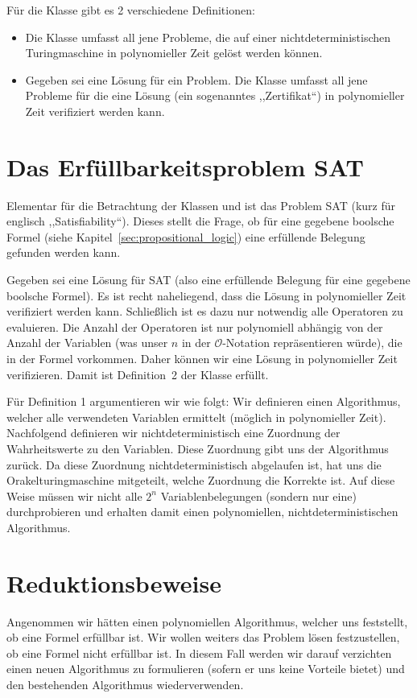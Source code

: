 Für die Klasse \cNP{} gibt es 2 verschiedene Definitionen:
\begin{itemize}
  \item Die Klasse \cNP{} umfasst all jene Probleme, die auf einer nichtdeterministischen Turingmaschine in polynomieller Zeit gelöst werden können.
  \item Gegeben sei eine Lösung für ein Problem. Die Klasse \cNP{} umfasst all jene Probleme für die eine Lösung (ein sogenanntes ,,Zertifikat``) in polynomieller Zeit verifiziert werden kann.
\end{itemize}

\section{Das Erfüllbarkeitsproblem SAT}
%
Elementar für die Betrachtung der Klassen \cP{} und \cNP{} ist das Problem SAT (kurz für englisch ,,Satisfiability``). Dieses stellt die Frage, ob für eine gegebene boolsche Formel (siehe Kapitel~\ref{sec:propositional_logic}) eine erfüllende Belegung gefunden werden kann.

Gegeben sei eine Lösung für SAT (also eine erfüllende Belegung für eine gegebene boolsche Formel). Es ist recht naheliegend, dass die Lösung in polynomieller Zeit verifiziert werden kann. Schließlich ist es dazu nur notwendig alle Operatoren zu evaluieren. Die Anzahl der Operatoren ist nur polynomiell abhängig von der Anzahl der Variablen (was unser $n$ in der $\mathcal{O}$-Notation repräsentieren würde), die in der Formel vorkommen. Daher können wir eine Lösung in polynomieller Zeit verifizieren. Damit ist Definition~2 der Klasse \cNP{} erfüllt.

Für Definition 1 argumentieren wir wie folgt: Wir definieren einen Algorithmus, welcher alle verwendeten Variablen ermittelt (möglich in polynomieller Zeit). Nachfolgend definieren wir nichtdeterministisch eine Zuordnung der Wahrheitswerte zu den Variablen. Diese Zuordnung gibt uns der Algorithmus zurück. Da diese Zuordnung nichtdeterministisch abgelaufen ist, hat uns die Orakelturingmaschine mitgeteilt, welche Zuordnung die Korrekte ist. Auf diese Weise müssen wir nicht alle $2^n$ Variablenbelegungen (sondern nur eine) durchprobieren und erhalten damit einen polynomiellen, nichtdeterministischen Algorithmus.

\section{Reduktionsbeweise}
%
Angenommen wir hätten einen polynomiellen Algorithmus, welcher uns feststellt, ob eine Formel erfüllbar ist. Wir wollen weiters das Problem lösen festzustellen, ob eine Formel nicht erfüllbar ist. In diesem Fall werden wir darauf verzichten einen neuen Algorithmus zu formulieren (sofern er uns keine Vorteile bietet) und den bestehenden Algorithmus wiederverwenden.

